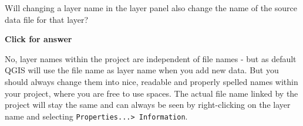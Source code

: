 \documentclass[
  letterpaper,
  DIV=11,
  numbers=noendperiod]{scrreprt}
\begin{document}
\begin{tcolorbox}[enhanced jigsaw, breakable, toptitle=1mm, colback=white, left=2mm, leftrule=.75mm, titlerule=0mm, colframe=quarto-callout-important-color-frame, opacityback=0, title=\textcolor{quarto-callout-important-color}{\faExclamation}\hspace{0.5em}{Stop and Think}, toprule=.15mm, opacitybacktitle=0.6, bottomtitle=1mm, colbacktitle=quarto-callout-important-color!10!white, bottomrule=.15mm, coltitle=black, rightrule=.15mm, arc=.35mm]

Will changing a layer name in the layer panel also change the name of
the source data file for that layer?

\end{tcolorbox}

\begin{tcolorbox}[enhanced jigsaw, leftrule=.75mm, colframe=quarto-callout-important-color-frame, breakable, toprule=.15mm, bottomrule=.15mm, arc=.35mm, rightrule=.15mm, opacityback=0, colback=white, left=2mm]

\vspace{-3mm}\textbf{Click for answer}\vspace{3mm}

No, layer names within the project are independent of file names - but
as default QGIS will use the file name as layer name when you add new
data. But you should always change them into nice, readable and properly
spelled names within your project, where you are free to use spaces. The
actual file name linked by the project will stay the same and can always
be seen by right-clicking on the layer name and selecting
\texttt{Properties...\textgreater{}\ Information}.

\end{tcolorbox}
\end{document}
